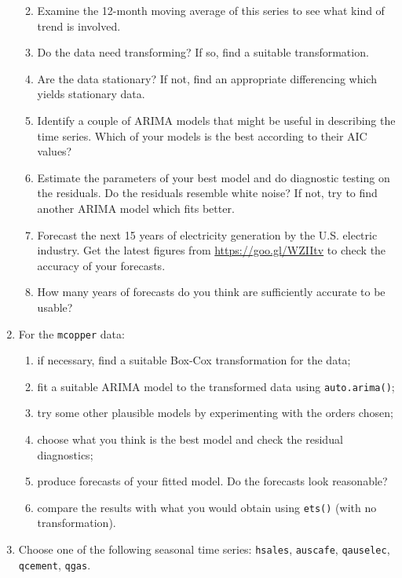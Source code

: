 \documentclass[]{book}
\providecommand{\tightlist}{%
  \setlength{\itemsep}{0pt}\setlength{\parskip}{0pt}}
\begin{document}
\begin{enumerate}
  \begin{enumerate}
  \def\labelenumii{(\alph{enumii})}
  \tightlist
  \item
    Examine the 12-month moving average of this series to see what kind of trend is involved.
  \item
    Do the data need transforming? If so, find a suitable transformation.
  \item
    Are the data stationary? If not, find an appropriate differencing which yields stationary data.
  \item
    Identify a couple of ARIMA models that might be useful in describing the time series. Which of your models is the best according to their AIC values?
  \item
    Estimate the parameters of your best model and do diagnostic testing on the residuals. Do the residuals resemble white noise? If not, try to find another ARIMA model which fits better.
  \item
    Forecast the next 15 years of electricity generation by the U.S. electric industry. Get the latest figures from \url{https://goo.gl/WZIItv} to check the accuracy of your forecasts.
  \item
    How many years of forecasts do you think are sufficiently accurate to be usable?
  \end{enumerate}
\item
  For the \texttt{mcopper} data:

  \begin{enumerate}
  \def\labelenumii{(\alph{enumii})}
  \tightlist
  \item
    if necessary, find a suitable Box-Cox transformation for the data;
  \item
    fit a suitable ARIMA model to the transformed data using \texttt{auto.arima()};
  \item
    try some other plausible models by experimenting with the orders chosen;
  \item
    choose what you think is the best model and check the residual diagnostics;
  \item
    produce forecasts of your fitted model. Do the forecasts look reasonable?
  \item
    compare the results with what you would obtain using \texttt{ets()} (with no transformation).
  \end{enumerate}
\item
  Choose one of the following seasonal time series: \texttt{hsales}, \texttt{auscafe}, \texttt{qauselec}, \texttt{qcement}, \texttt{qgas}.


\end{enumerate}
\end{document}
